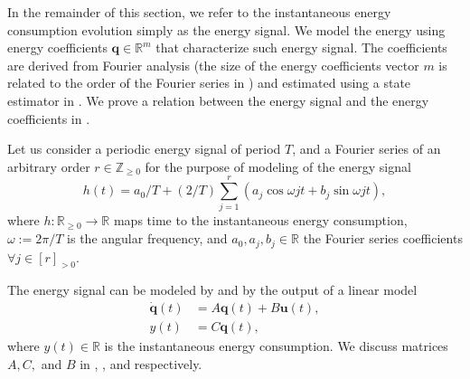 In the remainder of this section, we refer to the instantaneous energy consumption evolution simply as the energy signal. We model the energy using energy coefficients $\mathbf{q}\in\mathbb{R}^m$ that characterize such energy signal. The coefficients are derived from Fourier analysis (the size of the energy coefficients vector $m$ is related to the order of the Fourier series in ) and estimated using a state estimator in . We prove a relation between the energy signal and the energy coefficients in . %

Let us consider a periodic energy signal of period $T$, and a Fourier series of an arbitrary order $r\in\mathbb{Z}_{\geq 0}$ for the purpose of modeling of the energy signal
\begin{equation}\label{eq:fourier}
  h(t)=a_0/T+(2/T)\sum_{j=1}^{r}{\left(a_j\cos{\omega jt}+b_j\sin{\omega jt}\right)},
\end{equation}
where $h:\mathbb{R}_{\geq 0}\rightarrow\mathbb{R}$ maps time to the instantaneous energy consumption, $\omega:=2\pi/T$ is the angular frequency, and $a_0,a_j,b_j\in\mathbb{R}$ the Fourier series coefficients $\forall j\in[r]_{>0}$.

The energy signal can be modeled by  and by the output of a linear model
\begin{subequations}\label{eq:state-perf}\begin{align}
  \dot{\mathbf{q}}(t)&=A\mathbf{q}(t)+B\mathbf{u}(t),\\
  y(t)&=C\mathbf{q}(t),
\end{align}\end{subequations}
where $y(t)\in\mathbb{R}$ is the instantaneous energy consumption. We discuss matrices $A,C,$ and $B$ in , , and  respectively.

